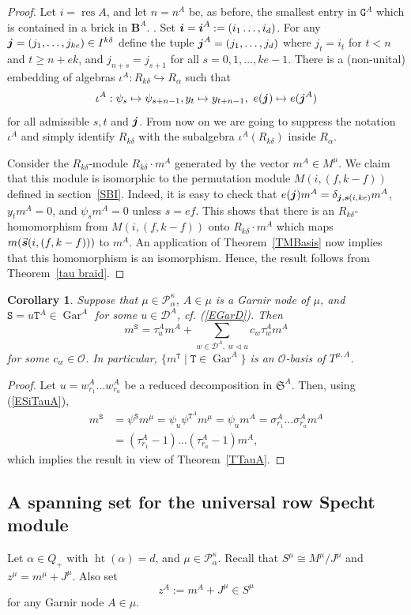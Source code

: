 \documentclass[twoside,11pt,reqno]{amsart}
\numberwithin{equation}{section}
\newtheorem{Corollary}[equation]{Corollary}
\theoremstyle{definition}  %
\def\bi{\text{\boldmath$i$}}
\def\bj{\text{\boldmath$j$}}
\def\bs{\text{\boldmath$s$}}
\newcommand{\res}{\operatorname{res}}
\newcommand{\Stab}{\operatorname{Stab}}
\newcommand{\0}{{\bar 0}}
\newcommand{\1}{{\bar 1}}
\newcommand{\al}{\alpha}
\def\Si{\mathfrak{S}}
\newcommand{\si}{\sigma}
\newcommand{\de}{\delta}
\def\Belt{\mathbf{B}}
\newcommand{\D}{{\mathscr D}}
\newcommand\Par[1][]{{\mathscr P}^{\kappa#1}}
\def\T{{\mathtt T}}
\def\Stab{{\mathtt S}}
\def\G{{\mathtt G}}
\def\height{{\operatorname{ht}}}
\def\Gar{{\operatorname{Gar}}}
\def\into{{\hookrightarrow}}
\renewcommand\O{\mathcal O}
\begin{document}
\begin{proof}
Let $i=\res A$, and let $n=n^A$ be, as before, the smallest entry in $\G^A$ which is contained in a brick in
$\Belt^A$. . Set $\bi=\bi^A:=(i_1\dots,i_d)$. For any $\bj=(j_1,\dots,j_{ke})\in I^{k\de}$ define the tuple 
$
\bj^A=(j_1,\dots,j_d)
$ 
where $j_t=i_t$ for $t<n$ and $t\geq n+ek$, and $j_{n+s}=j_{s+1}$ for all $s=0,1,\dots,ke-1$. 
There is a (non-unital) embedding of algebras $\iota^A:R_{k\de}\into R_\al$ such that 
$$
\iota^A: \psi_s\mapsto\psi_{s+n-1}, y_t\mapsto y_{t+n-1},\ e(\bj)\mapsto e(\bj^A)
$$
for all admissible $s,t$ and $\bj$. 
From now on we are going to suppress the notation $\iota^A$ and simply identify $R_{k\de}$ with the subalgebra $\iota^A(R_{k\de})$ inside $R_\al$. 

Consider the $R_{k\de}$-module $R_{k\de}\cdot m^A$ generated by the vector $m^A\in M^\mu$.  We claim that this module is isomorphic to the permutation module $M(i,(f,k-f))$ defined in section~\ref{SBI}. Indeed, it is easy to check that $e(\bj)m^A=\de_{\bj,\bs(i,ke)}m^A$, $y_tm^A=0$, and $\psi_sm^A=0$ unless $s=ef$. This shows that there is an $R_{k\de}$-homomorphism from $M(i,(f,k-f))$ onto $R_{k\de}\cdot m^A$ which maps $m(\vec{\bs}(i,(f,k-f)))$ to $m^A$. An application of Theorem~\ref{TMBasis} now implies that this homomorphism is an isomorphism. Hence, the result follows from Theorem~\ref{tau braid}. 
\end{proof}



\begin{Corollary} \label{C8910}%
Suppose that $\mu\in\Par_\al$, $A\in\mu$ is a Garnir node of $\mu$, and $\Stab=u\T^A\in\Gar^A$ for some $u\in\D^A$, cf. (\ref{EGarD}). Then
$$
m^\Stab=\tau_u^A m^A+\sum_{w\in\D^A,\ w\lhd u} c_w\tau_w^Am^A
$$
for some $c_w\in\O$. In particular, $\{m^\T \mid \T\in\Gar^A\}$  
is an $\O$-basis of $T^{\mu,A}$.
\end{Corollary}
\begin{proof}
Let $u=w_{r_1}^A\dots w_{r_a}^A$ be a reduced decomposition in $\Si^A$. Then, using (\ref{ESiTauA}), 
\begin{align*}
m^\Stab&=\psi^\Stab m^\mu=\psi_u\psi^{\T^A}m^\mu=\psi_u m^A=\si_{r_1}^A\dots\si_{r_a}^Am^A
\\
&=(\tau_{r_1}^A-1)\dots(\tau_{r_a}^A-1)m^A,
\end{align*}
which implies the result in view of Theorem~\ref{TTauA}. 
\end{proof}

\subsection{A spanning set for the universal row Specht module}\label{SSspanning}
Let $\al\in Q_+$ with $\height(\al)=d$, and $\mu\in \Par_\al$. Recall that 
$S^\mu\cong M^\mu/J^\mu$ and $z^\mu=m^\mu+J^\mu$. 
Also set 
$$z^A:=m^A+J^\mu\in S^\mu
$$
for any Garnir node $A\in\mu$. 
\end{document}
